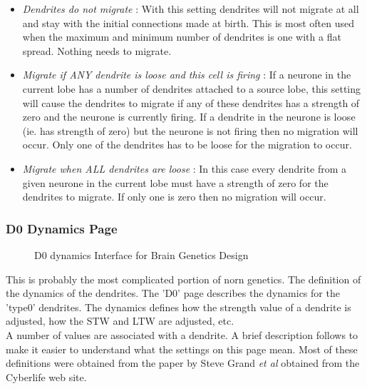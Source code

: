 \documentclass[11pt,twoside,a4paper]{article}
\begin{document}
\begin{itemize}
	\item[] \emph{Dendrites do not migrate} : With this setting dendrites will not migrate at all and stay with the initial connections made at birth. This is most often used when the maximum and minimum number of dendrites is one with a flat spread. Nothing needs to migrate.
	\item[] \emph{Migrate if ANY dendrite is loose and this cell is firing} : If a neurone in the current lobe has a number of dendrites attached to a source lobe, this setting will cause the dendrites to migrate if any of these dendrites has a strength of zero and the neurone is currently firing. If a dendrite in the neurone is loose (ie. has strength of zero) but the neurone is not firing then no migration will occur. Only one of the dendrites has to be loose for the migration to occur.
	\item[] \emph{Migrate when ALL dendrites are loose} : In this case every dendrite from a given neurone in the current lobe must have a strength of zero for the dendrites to migrate. If only one is zero then no migration will occur.
\end{itemize}


\subsubsection{D0 Dynamics Page}

\begin{minipage}{0.4\linewidth}
\begin{figure}[H]
	\centerline {} %
	\caption{D0 dynamics Interface for Brain Genetics Design}
	\label{fig:brain_d0dynamics}
\end{figure}
\end{minipage}
\begin{minipage}{0.1\linewidth}\end{minipage}
\begin{minipage}{0.5\linewidth}
This is probably the most complicated portion of norn genetics. The definition of the dynamics of the dendrites. The 'D0' page describes the dynamics for the 'type0' dendrites. The dynamics defines how the strength value of a dendrite is adjusted, how the STW and LTW are adjusted, etc.~\\

A number of values are associated with a dendrite. A brief description follows to make it easier to understand what the settings on this page mean. Most of these definitions were obtained from the paper by Steve Grand \textit{et al} obtained from the Cyberlife web site.
\end{minipage}~\\
\end{document}
